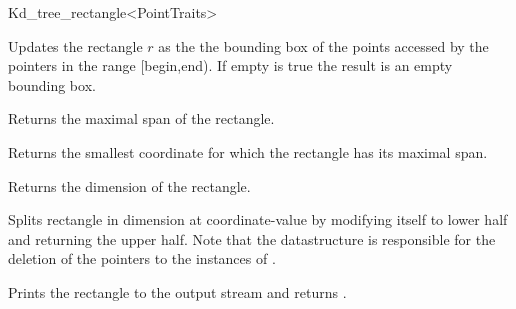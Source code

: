 \begin{ccRefClass}{Kd_tree_rectangle<PointTraits>}
\begin{ccAdvanced}
{Updates the rectangle $r$ as the the bounding box of the points accessed by the pointers
 in the range [begin,end). If empty is true the result is an empty bounding box.} 
 
{Returns the maximal span of the rectangle.}

{Returns the smallest coordinate for which the rectangle has its maximal span.}

{Returns the dimension of the rectangle.}

{Splits rectangle in dimension  at coordinate-value  
 by modifying itself to lower half and returning the upper half.
Note that the  datastructure is responsible for the
deletion of the pointers to the instances of .} 


{Prints the rectangle  to the output stream  and returns .}


\end{ccAdvanced}


\end{ccRefClass}


